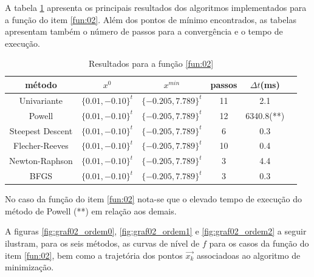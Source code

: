 \documentclass[10pt, a4paper]{article}
\begin{document}
A tabela \ref{table:resultadosf2} apresenta os principais resultados dos algoritmos implementados para a fun\c c\~ao do item \ref{fun:02}. Al\'em dos pontos de m\'inimo encontrados, as tabelas apresentam tamb\'em o n\'umero de passos para a converg\^encia e o tempo de execu\c c\~ao.

\begin{table}[H]
      \small
      \centering
      \caption{Resultados para a fun\c c\~ao \ref{fun:02}}
      \begin{tabular}{c|c|c|c|c|c}
            m\'etodo           & $x^0$ & $x^{min}$ & passos & $\Delta t$(ms) \\
            \hline
            Univariante         & $\{0.01,-0.10\}^t$     & $\{-0.205,7.789\}^t$  & 11 & 2.1 \\
            Powell              & $\{0.01,-0.10\}^t$     & $\{-0.205,7.789\}^t$  & 12 & 6340.8(**)  \\
            Steepest Descent    & $\{0.01,-0.10\}^t$     & $\{-0.205,7.789\}^t$  &  6 & 0.3 \\
            Flecher-Reeves      & $\{0.01,-0.10\}^t$     & $\{-0.205,7.789\}^t$  & 10 & 0.4 \\
            Newton-Raphson      & $\{0.01,-0.10\}^t$     & $\{-0.205,7.789\}^t$  &  3 & 4.4 \\
            BFGS                & $\{0.01,-0.10\}^t$     & $\{-0.205,7.789\}^t$  &  3 & 0.3 \\
     \end{tabular}
      \label{table:resultadosf2}
\end{table}

No caso da fun\c c\~ao do item \ref{fun:02} nota-se que o elevado tempo de execu\c c\~ao do m\'etodo de Powell (**) em rela\c c\~ao aos demais.

A figuras \ref{fig:graf02_ordem0}, \ref{fig:graf02_ordem1} e \ref{fig:graf02_ordem2} a seguir ilustram, para os seis m\'etodos, as curvas de n\'ivel de $f$ para os casos da fun\c c\~ao do item \ref{fun:02}, bem como a trajet\'oria dos pontos $\vec{x_{k}}$ associadoas ao algoritmo de minimiza\c c\~ao.
\end{document}
